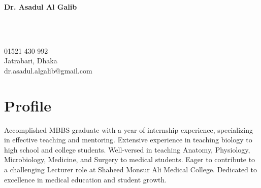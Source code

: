 \documentclass[a4paper,11pt]{article}
\begin{document}
\begin{minipage}[t][3.2cm]{1.2\textwidth}
    \raggedright
  \begin{minipage}[h][2.6cm][h]{0.4\textwidth}
    {\Huge\bfseries\color{black}Dr. Asadul Al Galib}
  \end{minipage}
  \begin{minipage}[h][2.6cm][h]{0.03\textwidth}
      \faPhone\\
      \faMapMarker\\
      \faEnvelopeO
  \end{minipage}
  \begin{minipage}[h][2.6cm][h]{0.28\textwidth}
      01521 430 992\\
      Jatrabari, Dhaka\\
      dr.asadul.algalib@gmail.com
  \end{minipage}
\end{minipage} 
\begin{minipage}[t][5.2cm]{0.98\textwidth}
  \section*{Profile}
  Accomplished MBBS graduate with a year of internship experience, specializing in effective teaching and mentoring. 
  Extensive experience in teaching biology to high school and college students. 
  Well-versed in teaching Anatomy, Physiology, Microbiology, Medicine, and Surgery to medical students. 
  Eager to contribute to a challenging Lecturer role at Shaheed Monsur Ali Medical College. 
  Dedicated to excellence in medical education and student growth.
\end{minipage}
\end{document}
